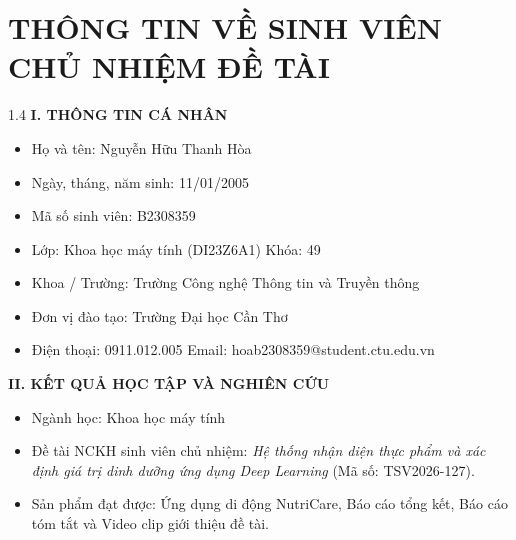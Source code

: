 {}
\chapter*{THÔNG TIN VỀ SINH VIÊN CHỦ NHIỆM ĐỀ TÀI}

\begin{spacing}{1.4}
\noindent\textbf{I. THÔNG TIN CÁ NHÂN}
\begin{itemize}
    \item Họ và tên: Nguyễn Hữu Thanh Hòa
    \item Ngày, tháng, năm sinh: 11/01/2005
    \item Mã số sinh viên: B2308359
    \item Lớp: Khoa học máy tính (DI23Z6A1) \quad Khóa: 49
    \item Khoa / Trường: Trường Công nghệ Thông tin và Truyền thông
    \item Đơn vị đào tạo: Trường Đại học Cần Thơ
    \item Điện thoại: 0911.012.005 \quad Email: hoab2308359@student.ctu.edu.vn
\end{itemize}

\vspace{0.3cm}
\noindent\textbf{II. KẾT QUẢ HỌC TẬP VÀ NGHIÊN CỨU}
\begin{itemize}
    \item Ngành học: Khoa học máy tính
    \item Đề tài NCKH sinh viên chủ nhiệm: \textit{Hệ thống nhận diện thực phẩm và xác định giá trị dinh dưỡng ứng dụng Deep Learning} (Mã số: TSV2026-127).
    \item Sản phẩm đạt được: Ứng dụng di động NutriCare, Báo cáo tổng kết, Báo cáo tóm tắt và Video clip giới thiệu đề tài.
\end{itemize}
\end{spacing}